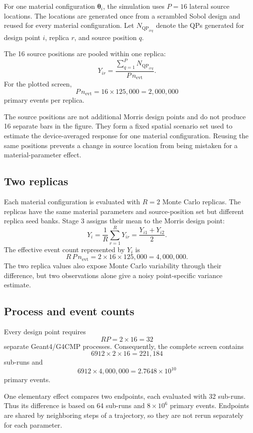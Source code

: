 \documentclass[11pt]{article}
\newcommand{\NQP}{N_{\mathrm{QP}}}
\begin{document}
For one material configuration $\boldsymbol{\theta}_i$, the simulation uses
$P=16$ lateral source locations.  The locations are generated once from a
scrambled Sobol design and reused for every material configuration.  Let
$\NQP_{irq}$ denote the QPs generated for design point $i$, replica $r$, and
source position $q$.

The 16 source positions are pooled within one replica:
\[
Y_{ir}
=
\frac{\displaystyle\sum_{q=1}^{P}\NQP_{irq}}
{P\,n_{\mathrm{evt}}}.
\]
For the plotted screen,
\[
P\,n_{\mathrm{evt}}
=16\times125{,}000
=2{,}000{,}000
\]
primary events per replica.

The source positions are not additional Morris design points and do not
produce 16 separate bars in the figure.  They form a fixed spatial scenario
set used to estimate the device-averaged response for one material
configuration.  Reusing the same positions prevents a change in source
location from being mistaken for a material-parameter effect.

\subsection{Two replicas}

Each material configuration is evaluated with $R=2$ Monte Carlo replicas.
The replicas have the same material parameters and source-position set but
different replica seed banks.  Stage 3 assigns their mean to the Morris
design point:
\[
Y_i
=
\frac{1}{R}\sum_{r=1}^{R}Y_{ir}
=
\frac{Y_{i1}+Y_{i2}}{2}.
\]
The effective event count represented by $Y_i$ is
\[
R\,P\,n_{\mathrm{evt}}
=2\times16\times125{,}000
=4{,}000{,}000.
\]
The two replica values also expose Monte Carlo variability through their
difference, but two observations alone give a noisy point-specific variance
estimate.

\subsection{Process and event counts}

Every design point requires
\[
R P=2\times16=32
\]
separate Geant4/G4CMP processes.  Consequently, the complete screen contains
\[
6912\times2\times16=221{,}184
\]
sub-runs and
\[
6912\times4{,}000{,}000
=2.7648\times10^{10}
\]
primary events.

One elementary effect compares two endpoints, each evaluated with 32
sub-runs.  Thus its difference is based on 64 sub-runs and $8\times10^6$
primary events.  Endpoints are shared by neighboring steps of a trajectory,
so they are not rerun separately for each parameter.
\end{document}
